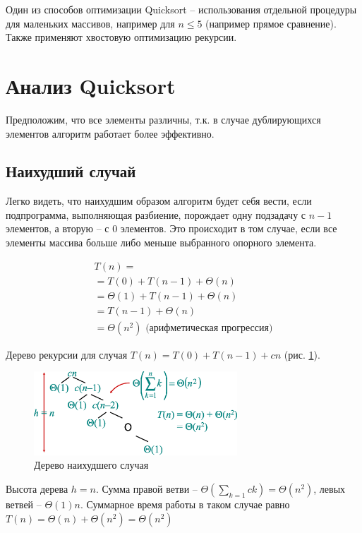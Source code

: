 \documentclass[11pt]{article}
\begin{document}
Один из способов оптимизации Quicksort -- использования отдельной процедуры для маленьких массивов, например для $n \leqslant 5$ (например прямое сравнение). Также применяют хвостовую оптимизацию рекурсии.

\section{Анализ Quicksort}

Предположим, что все элементы различны, т.к. в случае дублирующихся элементов алгоритм работает более эффективно.

\subsection{Наихудший случай}

Легко видеть, что наихудшим образом алгоритм будет себя вести, если подпрограмма, выполняющая разбиение, порождает одну подзадачу с $n-1$ элементов, а вторую -- с $0$ элементов. Это происходит в том случае, если все элементы массива больше либо меньше выбранного опорного элемента.

\begin{align*}
  T(n) = \\
    = T(0) + T(n-1) + \Theta(n) \\ 
    = \Theta(1) + T(n-1) + \Theta(n) \\
    = T(n-1) + \Theta(n) \\
    = \Theta(n^2) \text{ (арифметическая прогрессия)}
\end{align*}

Дерево рекурсии для случая $T(n) = T(0) + T(n-1) + cn$ (рис. \ref{fig:tree1}). 

\begin{figure}[ht]
  \centering
  \includegraphics[width=3in]{lecture4/tree1.eps}
  \caption{Дерево наихудшего случая}
  \label{fig:tree1}
\end{figure}

Высота дерева $h = n$. Сумма правой ветви -- $\Theta(\sum_{k=1}ck) = \Theta(n^2)$, левых ветвей -- ${\Theta(1)}n$. Суммарное время работы в таком случае равно $T(n) = \Theta(n) + \Theta(n^2) = \Theta(n^2)$
\end{document}
